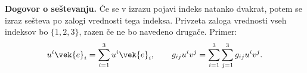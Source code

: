 \textbf{Dogovor o seštevanju.} Če se v izrazu pojavi indeks natanko dvakrat, potem
se izraz sešteva po zalogi vrednosti tega indeksa. Privzeta zaloga vrednosti
vseh indeksov bo $\{1,2,3\}$, razen če ne bo navedeno drugače. Primer:
\[
	u^i\vek{e}_i=\sum_{i=1}^3 u^i\vek{e}_i,\qquad
	g_{ij}u^iv^j=\sum_{i=1}^3\sum_{j=1}^3g_{ij}u^iv^j.
\]
